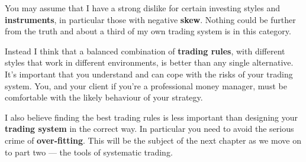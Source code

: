 You may assume that I have a strong dislike for certain investing styles and \textbf{instruments}, in particular those with negative \textbf{skew}. Nothing could be further from the truth and about a third of my own trading system is in this category.

Instead I think that a balanced combination of \textbf{trading rules}, with different styles that work in different environments, is better than any single alternative. It's important that you understand and can cope with the risks of your trading system. You, and your client if you're a professional money manager, must be comfortable with the likely behaviour of your strategy.

I also believe finding the best trading rules is less important than designing your \textbf{trading system} in the correct way. In particular you need to avoid the serious crime of \textbf{over-fitting}. This will be the subject of the next chapter as we move on to part two --- the tools of systematic trading.
